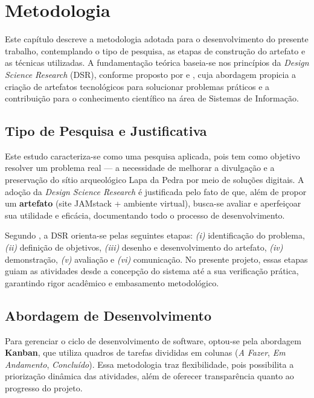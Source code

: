 \chapter{Metodologia}
\label{cap:metodologia}

Este capítulo descreve a metodologia adotada para o desenvolvimento do presente trabalho, contemplando o tipo de pesquisa, as etapas de construção do artefato e as técnicas utilizadas. A fundamentação teórica baseia-se nos princípios da \textit{Design Science Research} (DSR), conforme proposto por \cite{gregor2013positioning} e , cuja abordagem propicia a criação de artefatos tecnológicos para solucionar problemas práticos e a contribuição para o conhecimento científico na área de Sistemas de Informação.

\section{Tipo de Pesquisa e Justificativa}
\label{sec:tipo_pesquisa}

Este estudo caracteriza-se como uma pesquisa aplicada, pois tem como objetivo resolver um problema real --- a necessidade de melhorar a divulgação e a preservação do sítio arqueológico Lapa da Pedra por meio de soluções digitais. A adoção da \textit{Design Science Research} é justificada pelo fato de que, além de propor um \textbf{artefato} (site JAMstack + ambiente virtual), busca-se avaliar e aperfeiçoar sua utilidade e eficácia, documentando todo o processo de desenvolvimento.

Segundo \cite{gregor2013positioning}, a DSR orienta-se pelas seguintes etapas: \textit{(i)} identificação do problema, \textit{(ii)} definição de objetivos, \textit{(iii)} desenho e desenvolvimento do artefato, \textit{(iv)} demonstração, \textit{(v)} avaliação e \textit{(vi)} comunicação. No presente projeto, essas etapas guiam as atividades desde a concepção do sistema até a sua verificação prática, garantindo rigor acadêmico e embasamento metodológico.

\section{Abordagem de Desenvolvimento}
\label{sec:abordagem_desenvolvimento}

Para gerenciar o ciclo de desenvolvimento de software, optou-se pela abordagem \textbf{Kanban}, que utiliza quadros de tarefas divididas em colunas (\textit{A Fazer}, \textit{Em Andamento}, \textit{Concluído}). Essa metodologia traz flexibilidade, pois possibilita a priorização dinâmica das atividades, além de oferecer transparência quanto ao progresso do projeto.

